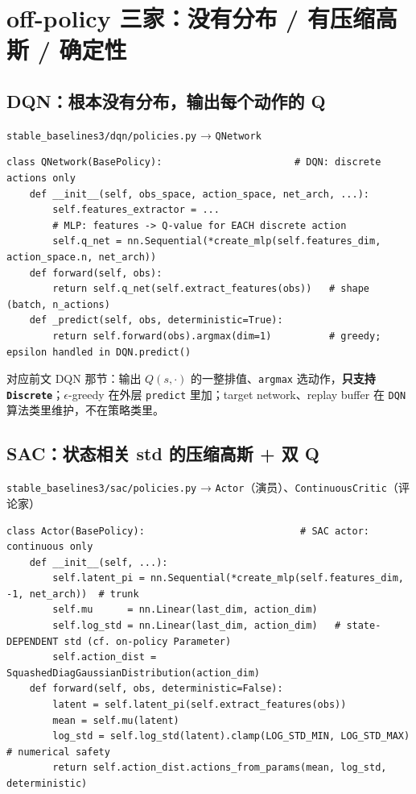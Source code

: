 \documentclass[11pt,a4paper]{article}
\begin{document}
\section{off-policy 三家：没有分布 / 有压缩高斯 / 确定性}

\subsection{DQN：根本没有分布，输出每个动作的 Q}

\begin{srcbox}
\texttt{stable\_baselines3/dqn/policies.py} → \texttt{QNetwork}
\end{srcbox}

\begin{lstlisting}
class QNetwork(BasePolicy):                       # DQN: discrete actions only
    def __init__(self, obs_space, action_space, net_arch, ...):
        self.features_extractor = ...
        # MLP: features -> Q-value for EACH discrete action
        self.q_net = nn.Sequential(*create_mlp(self.features_dim, action_space.n, net_arch))
    def forward(self, obs):
        return self.q_net(self.extract_features(obs))   # shape (batch, n_actions)
    def _predict(self, obs, deterministic=True):
        return self.forward(obs).argmax(dim=1)          # greedy; epsilon handled in DQN.predict()
\end{lstlisting}

\begin{tiebox}
对应前文 DQN 那节：输出 $Q(s,\cdot)$ 的一整排值、\texttt{argmax} 选动作，\textbf{只支持 \texttt{Discrete}}；$\epsilon$-greedy 在外层 \texttt{predict} 里加；target network、replay buffer 在 \texttt{DQN} 算法类里维护，不在策略类里。
\end{tiebox}

\subsection{SAC：状态相关 std 的压缩高斯 + 双 Q}

\begin{srcbox}
\texttt{stable\_baselines3/sac/policies.py} → \texttt{Actor}（演员）、\texttt{ContinuousCritic}（评论家）
\end{srcbox}

\begin{lstlisting}
class Actor(BasePolicy):                           # SAC actor: continuous only
    def __init__(self, ...):
        self.latent_pi = nn.Sequential(*create_mlp(self.features_dim, -1, net_arch))  # trunk
        self.mu      = nn.Linear(last_dim, action_dim)
        self.log_std = nn.Linear(last_dim, action_dim)   # state-DEPENDENT std (cf. on-policy Parameter)
        self.action_dist = SquashedDiagGaussianDistribution(action_dim)
    def forward(self, obs, deterministic=False):
        latent = self.latent_pi(self.extract_features(obs))
        mean = self.mu(latent)
        log_std = self.log_std(latent).clamp(LOG_STD_MIN, LOG_STD_MAX)   # numerical safety
        return self.action_dist.actions_from_params(mean, log_std, deterministic)
\end{lstlisting}
\end{document}
